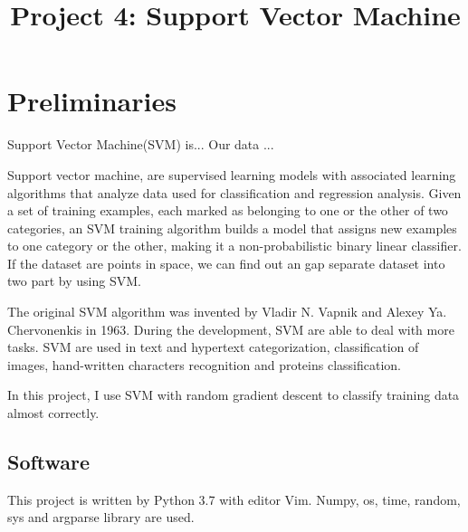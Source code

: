 \documentclass[conference,compsoc]{IEEEtran}
\begin{document}
\title{Project 4: Support Vector Machine}

\author{
}

\maketitle

\IEEEpeerreviewmaketitle

\section{Preliminaries}
Support Vector Machine(SVM) is...
Our data ...

Support vector machine, are supervised learning models with associated learning
algorithms that analyze data used for classification and regression analysis.
Given a set of training examples, each marked as belonging to one or the other
of two categories, an SVM training algorithm builds a model that assigns new
examples to one category or the other, making it a non-probabilistic binary
linear classifier.\cite{1} If the dataset are points in space, we can find out
an gap separate dataset into two part by using SVM.


The original SVM algorithm was invented by Vladir N. Vapnik and
Alexey Ya. Chervonenkis in 1963. During the development, SVM are able to deal
with more tasks. SVM are used in text and hypertext categorization,
classification of images, hand-written characters recognition and proteins
classification.

In this project, I use SVM with random gradient descent to classify training
data almost correctly. 


\subsection{Software}
This project is written by Python 3.7 with editor Vim. Numpy, os, time,
random, sys and argparse library are used.
\end{document}
